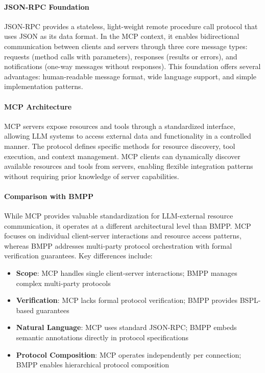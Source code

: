 \documentclass[11pt,a4paper]{article}
\begin{document}
	\paragraph{JSON-RPC Foundation} JSON-RPC provides a stateless, light-weight remote procedure call protocol that uses JSON as its data format. In the MCP context, it enables bidirectional communication between clients and servers through three core message types: requests (method calls with parameters), responses (results or errors), and notifications (one-way messages without responses). This foundation offers several advantages: human-readable message format, wide language support, and simple implementation patterns.
	
	\paragraph{MCP Architecture} MCP servers expose resources and tools through a standardized interface, allowing LLM systems to access external data and functionality in a controlled manner. The protocol defines specific methods for resource discovery, tool execution, and context management. MCP clients can dynamically discover available resources and tools from servers, enabling flexible integration patterns without requiring prior knowledge of server capabilities.
	
	\paragraph{Comparison with BMPP} While MCP provides valuable standardization for LLM-external resource communication, it operates at a different architectural level than BMPP. MCP focuses on individual client-server interactions and resource access patterns, whereas BMPP addresses multi-party protocol orchestration with formal verification guarantees. Key differences include:
	
	\begin{itemize}
		\item \textbf{Scope}: MCP handles single client-server interactions; BMPP manages complex multi-party protocols
		\item \textbf{Verification}: MCP lacks formal protocol verification; BMPP provides BSPL-based guarantees
		\item \textbf{Natural Language}: MCP uses standard JSON-RPC; BMPP embeds semantic annotations directly in protocol specifications
		\item \textbf{Protocol Composition}: MCP operates independently per connection; BMPP enables hierarchical protocol composition
	\end{itemize}
	
\end{document}
